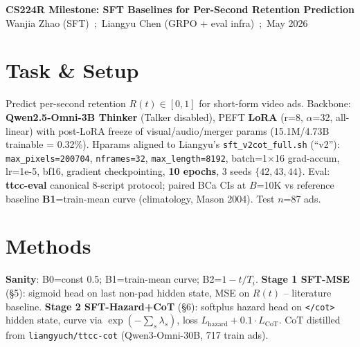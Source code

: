 \documentclass[10pt]{article}
\begin{document}
{\centering\normalsize\textbf{CS224R Milestone: SFT Baselines for Per-Second Retention Prediction}\\
\footnotesize Wanjia Zhao (SFT) \,;\, Liangyu Chen (GRPO + eval infra) \,;\, May 2026\par}
\vspace{1pt}

\section*{Task \& Setup}
Predict per-second retention $R(t)\!\in\![0,1]$ for short-form video ads.
Backbone: \textbf{Qwen2.5-Omni-3B Thinker} (Talker disabled), PEFT \textbf{LoRA} (r=8, $\alpha$=32, all-linear)
with post-LoRA freeze of visual/audio/merger params (15.1M/4.73B trainable = 0.32\%).
Hparams aligned to Liangyu's \texttt{sft\_v2cot\_full.sh} (``v2''):
\texttt{max\_pixels=200704}, \texttt{nframes=32}, \texttt{max\_length=8192}, batch=1$\times$16 grad-accum,
lr=1e-5, bf16, gradient checkpointing, \textbf{10 epochs}, 3 seeds $\{42,43,44\}$.
Eval: \textbf{ttcc-eval} canonical 8-script protocol; paired BCa CIs at $B$=10K vs reference baseline
\textbf{B1}=train-mean curve (climatology, Mason 2004). Test $n$=87 ads.

\section*{Methods}
\textbf{Sanity}: B0=const 0.5; B1=train-mean curve; B2=$1-t/T_i$.\quad
\textbf{Stage 1 SFT-MSE} (\S5): sigmoid head on last non-pad hidden state, MSE on $R(t)$ -- literature baseline.\quad
\textbf{Stage 2 SFT-Hazard+CoT} (\S6): softplus hazard head on \texttt{</cot>} hidden state, curve via $\exp(-\!\sum_s\!\lambda_s)$,
loss $L_\text{hazard}+0.1\!\cdot\!L_\text{CoT}$. CoT distilled from \texttt{liangyuch/ttcc-cot} (Qwen3-Omni-30B, 717 train ads).
\end{document}
